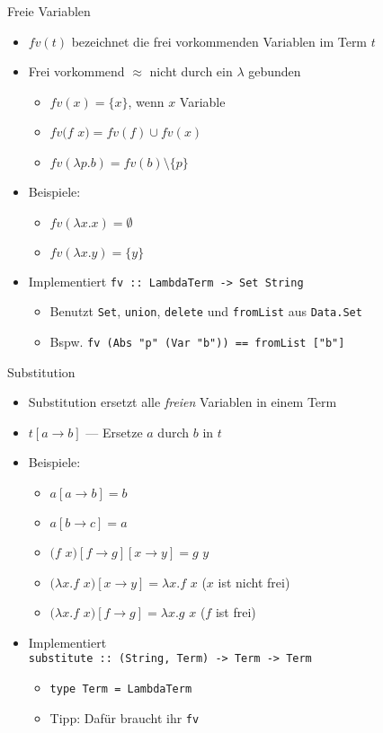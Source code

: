 \documentclass{beamer}
\begin{document}
\begin{frame}{Freie Variablen}
	\begin{itemize}
		\item $fv(t)$ bezeichnet die frei vorkommenden Variablen im Term $t$
		\item Frei vorkommend $\approx$ nicht durch ein $\lambda$ gebunden
		\begin{itemize}
			\item $fv(x) = \{x\}$, wenn $x$ Variable
			\item $fv(f$ $x) = fv(f) \cup fv(x)$
			\item $fv(\lambda{}p.b) = fv(b) \setminus \{p\}$
		\end{itemize}
		\item Beispiele:
		\begin{itemize}
			\item $fv(\lambda{}x.x) = \emptyset$
			\item $fv(\lambda{}x.y) = \{y\}$
		\end{itemize}
		\pause
		\item Implementiert \texttt{fv :: LambdaTerm -> Set String}
		\begin{itemize}
			\item Benutzt \texttt{Set}, \texttt{union}, \texttt{delete} und \texttt{fromList} aus \texttt{Data.Set}
            \item Bspw. \texttt{fv (Abs "p" (Var "b")) == fromList ["b"]}
		\end{itemize}
	\end{itemize}
\end{frame}

\begin{frame}{Substitution}
	\begin{itemize}
		\item Substitution ersetzt alle \emph{freien} Variablen in einem Term
		\item $t\left[a \to b\right]$ --- Ersetze $a$ durch $b$ in $t$
		\item Beispiele:
		\begin{itemize}
			\item $a\left[a \to b\right] = b$
			\item $a\left[b \to c\right] = a$
			\item $(f$ $x)\left[f \to g\right]\left[x \to y\right] = g$ $y$
			\pause
			\item $(\lambda{}x.f$ $x)\left[x \to y\right] = \lambda{}x.f$ $x$ ($x$ ist nicht frei)
			\item $(\lambda{}x.f$ $x)\left[f \to g\right] = \lambda{}x.g$ $x$ ($f$ ist frei)
		\end{itemize}
		\pause
		\item Implementiert\\
		      \texttt{substitute :: (String, Term) -> Term -> Term}
		\begin{itemize}
			\item \texttt{type Term = LambdaTerm}
			\item Tipp: Dafür braucht ihr \texttt{fv}
		\end{itemize}
	\end{itemize}
\end{frame}
\end{document}
